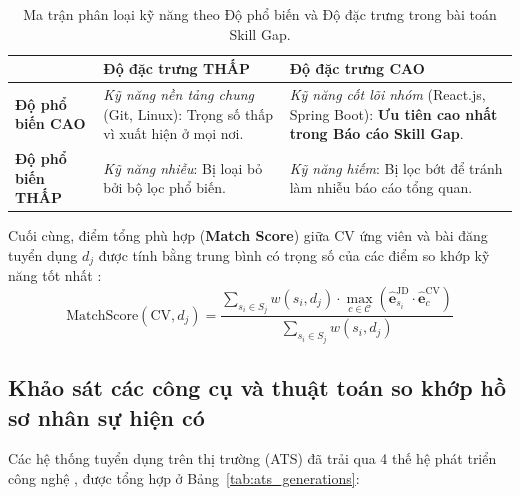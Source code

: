 \begin{table}[H]
\centering
\caption{Ma trận phân loại kỹ năng theo Độ phổ biến và Độ đặc trưng trong bài toán Skill Gap.}
\label{tab:skill_two_dim}
\begin{tabular}{|p{2.2cm}|p{4.8cm}|p{5.0cm}|}
\hline
 & \textbf{Độ đặc trưng THẤP} & \textbf{Độ đặc trưng CAO} \\
\hline
\textbf{Độ phổ biến CAO} &
\textit{Kỹ năng nền tảng chung} (Git, Linux): Trọng số thấp vì xuất hiện ở mọi nơi. &
\textit{Kỹ năng cốt lõi nhóm} (React.js, Spring Boot): \textbf{Ưu tiên cao nhất trong Báo cáo Skill Gap}. \\
\hline
\textbf{Độ phổ biến THẤP} &
\textit{Kỹ năng nhiễu}: Bị loại bỏ bởi bộ lọc phổ biến. &
\textit{Kỹ năng hiếm}: Bị lọc bớt để tránh làm nhiễu báo cáo tổng quan. \\
\hline
\end{tabular}
\end{table}

Cuối cùng, điểm tổng phù hợp (\textbf{Match Score}) giữa CV ứng viên và bài đăng tuyển dụng $d_j$ được tính bằng trung bình có trọng số của các điểm so khớp kỹ năng tốt nhất \cite{manning2008}:
\begin{equation}
    \text{MatchScore}(\text{CV}, d_j) = \frac{\sum_{s_i \in S_j} w(s_i, d_j) \cdot \displaystyle\max_{c \in \mathcal{C}} \left(\hat{\mathbf{e}}_{s_i}^{\text{JD}} \cdot \hat{\mathbf{e}}_{c}^{\text{CV}}\right)}{\sum_{s_i \in S_j} w(s_i, d_j)}
\end{equation}

\subsection{Khảo sát các công cụ và thuật toán so khớp hồ sơ nhân sự hiện có}

Các hệ thống tuyển dụng trên thị trường (ATS) đã trải qua 4 thế hệ phát triển công nghệ \cite{bhola2020retrieving, zhang2022skillspan, khaouja2021survey}, được tổng hợp ở Bảng~\ref{tab:ats_generations}:

